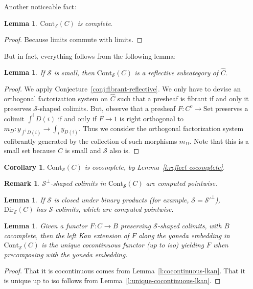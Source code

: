\documentclass{article}
\newcommand{\Cont}[1]{\text{Cont}_{#1}}
\newcommand{\Dir}[1]{\text{Dir}_{#1}}
\newcommand{\Set}{\text{Set}}
\newtheorem{corollary}[theorem]{Corollary}
\newtheorem{remark}[theorem]{Remark}
\newtheorem{lemma}[theorem]{Lemma}
\begin{document}
  Another noticeable fact:
  \begin{lemma}
    $\Cont{\mathcal{S}}(C)$ is complete.
  \end{lemma}
  \begin{proof}
   Because limits commute with limits.
  \end{proof}
  But in fact, everything follows from the following lemma:
  \begin{lemma}
    If $\mathcal{S}$ is small, then
    $\Cont{\mathcal{S}}(C)$ is a reflective subcategory of $\hat{C}$.
  \end{lemma}
  \begin{proof}
    We apply Conjecture~\ref{conj:fibrant-reflective}.
    We only have to devise an orthogonal factorization system on $\hat{C}$ such that a
    presheaf is fibrant if and only it preserves $\mathcal{S}$-shaped colimits.
    But, observe that a presheaf $F:C^o \rightarrow \Set$  preserves a colimit $\int^i D(i)$ if and
    only if $F\rightarrow 1$ is right orthogonal to $m_D:y_{\int^i D(i)}\rightarrow \int_i y_{D(i)}  $.
    Thus we consider the orthogonal factorization system cofibrantly generated
    by the collection of such morphisms $m_D$. Note that this is a small set
    because $C$ is small and $\mathcal{S}$ also is.
  \end{proof}
  \begin{corollary}
    $\Cont{\mathcal{S}}(C)$ is cocomplete, by Lemma~\ref{l:reflect-cocomplete}.
  \end{corollary}
  \begin{remark}
    $\mathcal{S}^\bot$-shaped colimits in $\Cont{\mathcal{S}}(C)$ are computed pointwise.
  \end{remark}
  \begin{lemma}
    If $\mathcal{S}$ is closed under binary products (for example, $\mathcal{S}
    = {\mathcal{S}'}^\bot$),
    $\Dir{\mathcal{S}}(C)$ has $\mathcal{S}$-colimits, which are
    computed pointwise.
  \end{lemma}
  \begin{lemma}
    Given a functor $F:C \rightarrow B$ preserving $\mathcal{S}$-shaped
    colimits, with $B$ cocomplete, then the left Kan extension of $F$ along the
    yoneda embedding in $\Cont{\mathcal{S}}(C)$ is the unique cocontinuous
    functor (up to iso) yielding $F$ when precomposing with the yoneda embedding.
  \end{lemma}
  \begin{proof}
    That it is cocontinuous comes from Lemma~\ref{l:cocontinuous-lkan}. That it
    is unique up to iso follows from Lemma~\ref{l:unique-cocontinuous-lkan}.
  \end{proof}
\end{document}
